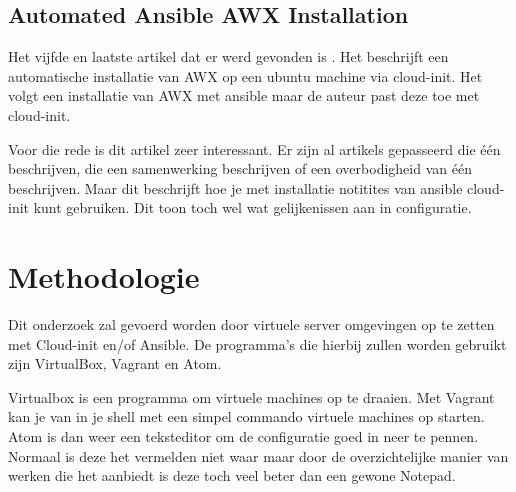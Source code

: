  \subsection{Automated Ansible AWX Installation}
 
Het vijfde en laatste artikel dat er werd gevonden is \textcite{deven}. Het beschrijft een automatische installatie van AWX op een ubuntu machine via cloud-init.  Het volgt een installatie van AWX met ansible maar de auteur past deze toe met cloud-init. 

Voor die rede is dit artikel zeer interessant. Er zijn al artikels gepasseerd die één beschrijven, die een samenwerking beschrijven of een overbodigheid van één beschrijven. Maar dit beschrijft hoe je met installatie notitites van ansible cloud-init kunt gebruiken. Dit toon toch wel wat gelijkenissen aan in configuratie.








\section{Methodologie}
\label{sec:methodologie}

Dit onderzoek zal gevoerd worden door virtuele server omgevingen op te zetten met Cloud-init en/of Ansible. De programma’s die hierbij zullen worden gebruikt zijn VirtualBox, Vagrant en Atom. 

Virtualbox is een programma om virtuele machines op te draaien. Met Vagrant kan je van in je shell met een simpel commando virtuele machines op starten. Atom is dan weer een teksteditor om de configuratie goed in neer te pennen. Normaal is deze het vermelden niet waar maar door de overzichtelijke manier van werken die het aanbiedt is deze toch veel beter dan een gewone Notepad.

